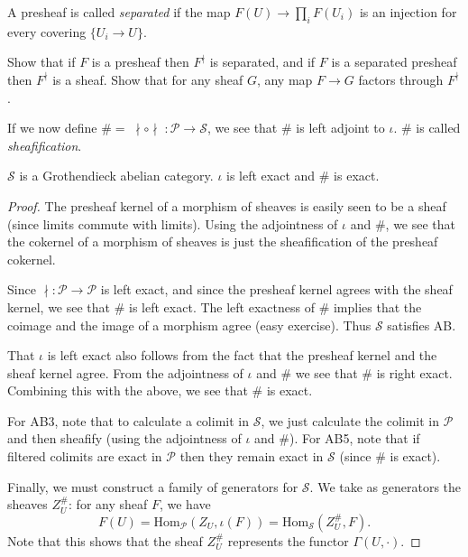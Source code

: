 \begin{defn} A presheaf is called \emph{separated} if the map $F(U) \rightarrow \prod_i F(U_i)$ is an injection for every covering $\{U_i \rightarrow U\}$.
\end{defn}

\begin{exer} Show that if $F$ is a presheaf then $F^\nmid$ is separated, and if $F$ is a separated presheaf then $F^\nmid$ is a sheaf. Show that for any sheaf $G$, any map $F\rightarrow G$ factors through $F^\nmid$.
\end{exer}

If we now define $\# = \; \nmid \circ \nmid \; : \mathcal{P} \rightarrow \mathcal{S}$, we see that $\#$ is left adjoint to $\iota$. $\#$ is called \emph{sheafification}.

\begin{prop} $\mathcal{S}$ is a Grothendieck abelian category. $\iota$ is left exact and $\#$ is exact.
\end{prop}
\begin{proof} The presheaf kernel of a morphism of sheaves is easily seen to be a sheaf (since limits commute with limits). Using the adjointness of $\iota$ and $\#$, we see that the cokernel of a morphism of sheaves is just the sheafification of the presheaf cokernel.

Since $\nmid : \mathcal{P} \rightarrow \mathcal{P}$ is left exact, and since the presheaf kernel agrees with the sheaf kernel, we see that $\#$ is left exact. The left exactness of $\#$ implies that the coimage and the image of a morphism agree (easy exercise). Thus $\mathcal{S}$ satisfies AB.

That $\iota$ is left exact also follows from the fact that the presheaf kernel and the sheaf kernel agree. From the adjointness of $\iota$ and $\#$ we see that $\#$ is right exact. Combining this with the above, we see that $\#$ is exact.

For AB3, note that to calculate a colimit in $\mathcal{S}$, we just calculate the colimit in $\mathcal{P}$ and then sheafify (using the adjointness of $\iota$ and $\#$). For AB5, note that if filtered colimits are exact in $\mathcal{P}$ then they remain exact in $\mathcal{S}$ (since $\#$ is exact).

Finally, we must construct a family of generators for $\mathcal{S}$. We take as generators the sheaves $Z_U^\#$: for any sheaf $F$, we have
\[
F(U) = \mbox{Hom}_{\mathcal{P}}(Z_U,\iota(F)) = \mbox{Hom}_{\mathcal{S}}(Z_U^\#,F).
\]
Note that this shows that the sheaf $Z_U^\#$ represents the functor $\Gamma(U,\cdot)$.
\end{proof}

